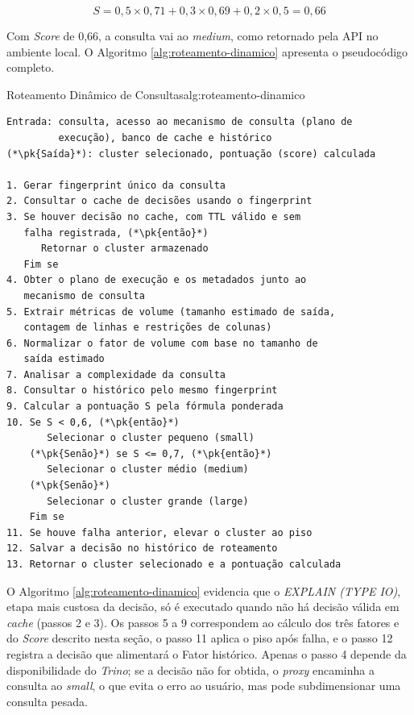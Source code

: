 \begin{equation}
\label{eq:score-final}
S = 0,5 \times 0,71 + 0,3 \times 0,69 + 0,2 \times 0,5 = 0,66
\end{equation}

Com \textit{Score} de 0,66, a consulta vai ao \textit{medium}, como retornado pela API no ambiente local. O Algoritmo \ref{alg:roteamento-dinamico} apresenta o pseudocódigo completo.

\begin{blocoalgoritmo}{Roteamento Dinâmico de Consultas}{alg:roteamento-dinamico}
\begin{framed}
\begin{lstlisting}[style=pseudomoldura]
Entrada: consulta, acesso ao mecanismo de consulta (plano de
         execução), banco de cache e histórico
(*\pk{Saída}*): cluster selecionado, pontuação (score) calculada

1. Gerar fingerprint único da consulta
2. Consultar o cache de decisões usando o fingerprint
3. Se houver decisão no cache, com TTL válido e sem
   falha registrada, (*\pk{então}*)
      Retornar o cluster armazenado
   Fim se
4. Obter o plano de execução e os metadados junto ao
   mecanismo de consulta
5. Extrair métricas de volume (tamanho estimado de saída,
   contagem de linhas e restrições de colunas)
6. Normalizar o fator de volume com base no tamanho de
   saída estimado
7. Analisar a complexidade da consulta
8. Consultar o histórico pelo mesmo fingerprint
9. Calcular a pontuação S pela fórmula ponderada
10. Se S < 0,6, (*\pk{então}*)
       Selecionar o cluster pequeno (small)
    (*\pk{Senão}*) se S <= 0,7, (*\pk{então}*)
       Selecionar o cluster médio (medium)
    (*\pk{Senão}*)
       Selecionar o cluster grande (large)
    Fim se
11. Se houve falha anterior, elevar o cluster ao piso
12. Salvar a decisão no histórico de roteamento
13. Retornar o cluster selecionado e a pontuação calculada
\end{lstlisting}
\end{framed}

\end{blocoalgoritmo}

O Algoritmo \ref{alg:roteamento-dinamico} evidencia que o \textit{EXPLAIN (TYPE IO)}, etapa mais custosa da decisão, só é executado quando não há decisão válida em \textit{cache} (passos 2 e 3). Os passos 5 a 9 correspondem ao cálculo dos três fatores e do \textit{Score} descrito nesta seção, o passo 11 aplica o piso após falha, e o passo 12 registra a decisão que alimentará o Fator histórico. Apenas o passo 4 depende da disponibilidade do \textit{Trino}; se a decisão não for obtida, o \textit{proxy} encaminha a consulta ao \textit{small}, o que evita o erro ao usuário, mas pode subdimensionar uma consulta pesada.

